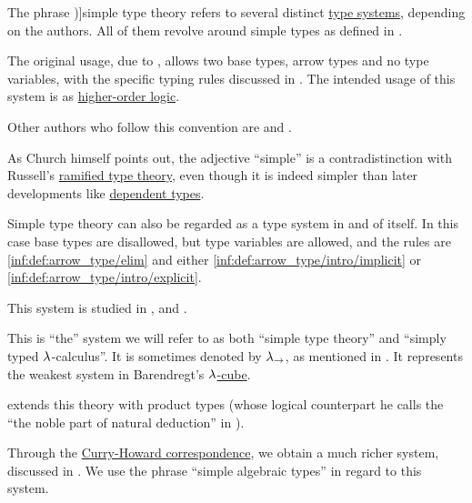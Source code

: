 \begin{concept}\label{con:simple_type_theory}
  The phrase \term[en=simple type theory (\cite[ix]{Hindley1997BasicSTT})]{simple type theory} refers to several distinct \hyperref[def:abstract_type_system]{type systems}, depending on the authors. All of them revolve around simple types as defined in .

  \begin{thmenum}
     The original usage, due to , allows two base types, arrow types and no type variables, with the specific typing rules discussed in . The intended usage of this system is as \hyperref[con:higher_order_logic]{higher-order logic}.

    Other authors who follow this convention are  and .

    As Church himself points out, the adjective \enquote{simple} is a contradistinction with Russell's \hyperref[con:ramified_type_theory]{ramified type theory}, even though it is indeed simpler than later developments like \hyperref[con:dependent_type]{dependent types}.

     Simple type theory can also be regarded as a type system in and of itself. In this case base types are disallowed, but type variables are allowed, and the rules are \ref{inf:def:arrow_type/elim} and either \ref{inf:def:arrow_type/intro/implicit} or \ref{inf:def:arrow_type/intro/explicit}.

    This system is studied in ,  and .

    This is \enquote{the} system we will refer to as both \enquote{simple type theory} and \enquote{simply typed \( {\mathrm \lambda} \)-calculus}. It is sometimes denoted by \( {\mathrm \lambda}_{\rightarrow} \), as mentioned in . It represents the weakest system in Barendregt's \hyperref[def:lambda_cube]{\( {\mathrm \lambda} \)-cube}.

     extends this theory with product types (whose logical counterpart he calls the \enquote{the noble part of natural deduction} in \cite[\S 5.3]{GirardEtAl1989ProofsAndTypes}).

     Through the \hyperref[con:curry_howard_correspondence]{Curry-Howard correspondence}, we obtain a much richer system, discussed in . We use the phrase \enquote{simple algebraic types} in regard to this system.


\end{thmenum}
\end{concept}
